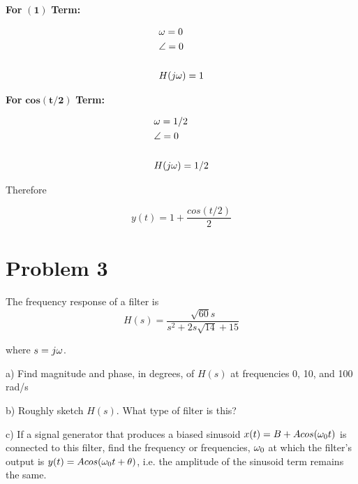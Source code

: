 \documentclass[11pt, fleqn]{article}
\begin{document}
\textbf{For} $\mathbf{(1)}$ \textbf{Term:}

\begin{align*}
    &\w = 0 \\
    &\angle = 0 \\
    &\vspace*{1mm} \\
    &\ctfreqresp = 1 
\end{align*}

\textbf{For} $\mathbf{ cos(t/2)}$ \textbf{Term:}

\begin{align*}
    &\w = 1/2 \\
    &\angle = 0 \\
    &\vspace*{1mm} \\ 
    &\ctfreqresp = 1/2
\end{align*}

Therefore 

$$
    y(t) = 1 + \frac{cos(t/2)}{2}
$$

\section*{Problem 3}

The frequency response of a filter is 
$$
    H(s) = \frac{\sqrt{60}s}{s^2 + 2s\sqrt{14} + 15}
$$

where $s = j\omega$.



a) Find magnitude and phase, in degrees, of $H(s)$ at frequencies 0, 10, and 100 rad/s

b) Roughly sketch $H(s)$. What type of filter is this?

c) If a signal generator that produces a biased sinusoid $x(t) = B + Acos(\omega_0 t)$ is connected to this filter, find the frequency or frequencies, $\omega_0$ at which the filter's output is $y(t) = Acos(\omega_0 t + \theta)$, i.e. the amplitude of the sinusoid term remains the same.
\end{document}
